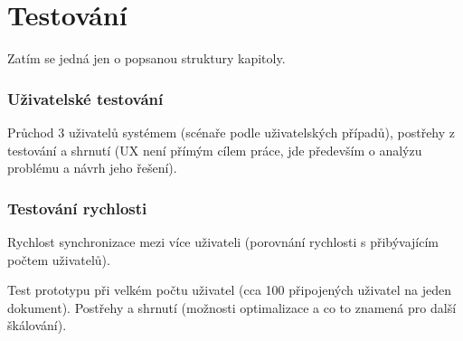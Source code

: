 
\chapter{Testování}\label{ch:testování}

Zatím se jedná jen o popsanou struktury kapitoly.

\subsection{Uživatelské testování}

Průchod 3 uživatelů systémem (scénaře podle uživatelských případů), postřehy z testování a shrnutí (UX není přímým cílem práce, jde především o analýzu problému a návrh jeho řešení).

\subsection{Testování rychlosti}

Rychlost synchronizace mezi více uživateli (porovnání rychlosti s přibývajícím počtem uživatelů).

Test prototypu při velkém počtu uživatel (cca 100 připojených uživatel na jeden dokument).
Postřehy a shrnutí (možnosti optimalizace a co to znamená pro další škálování).
